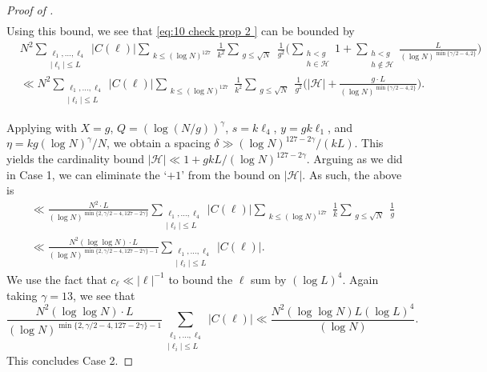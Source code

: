 \documentclass[12pt]{amsart}
\renewcommand{\leq}{\leqslant}
\numberwithin{equation}{section}
\theoremstyle{plain}
\theoremstyle{definition}
\renewcommand{\l}{\ell}
\newcommand{\CH}{\mathcal{H}}
\begin{document}
\begin{proof}[Proof of ]
\begin{align*}
		\end{align*}
		Using this bound, we see that \eqref{eq:10 check prop 2 } can be bounded by
		\begin{align*}
			&N^2\sum_{\substack{\l_1,\dots,\l_4 \\ |\l_i| \leq L}} |C(\bm{\l})| \sum_{\substack{k \leq (\log N)^{127}}} \frac{1}{k^2} \sum_{\substack{g \leq \sqrt{N}}} \frac{1}{g^2} \bigg(\sum_{\substack{h < g \\ h \in \CH }}1 +\sum_{\substack{h < g \\ h \not\in \CH}}\frac{L}{(\log N)^{\min\{\gamma/2-4,2\}}}\bigg)\\
			&\ll N^2\sum_{\substack{\l_1,\dots,\l_4 \\ |\l_i| \leq L}} |C(\bm{\l})|\sum_{\substack{k \leq (\log N)^{127}}} \frac{1}{k^2} \sum_{\substack{g \leq \sqrt{N}}} \frac{1}{g^2} \bigg( |\CH| +\frac{g \cdot L}{(\log N)^{\min\{\gamma/2-4,2\}}}\bigg).
		\end{align*}
		
		Applying  with $X=g$, $Q=(\log(N/g))^\gamma$, $s=k\l_4$, $y=gk\l_1$, and $\eta = kg(\log N)^\gamma/N$, we obtain a spacing $\delta \gg (\log N)^{127-2\gamma} / (k L)$. This yields the cardinality bound $|\CH| \ll 1+g k L/(\log N)^{127 - 2\gamma}$. Arguing as we did in Case 1, we can eliminate the `$+1$' from the bound on $|\CH|$. As such, the above is
		\begin{align*}
			&\ll \frac{N^2\cdot L}{(\log N)^{\min\{2,\gamma/2-4,127-2\gamma\}}} \sum_{\substack{\l_1,\dots,\l_4 \\ |\l_i| \leq L}} |C(\bm{\l})| \sum_{\substack{k \leq (\log N)^{127}}} \frac{1}{k}\sum_{\substack{g \leq \sqrt{N} }} \frac{1}{g}\\
			&\ll \frac{N^2 (\log \log N)\cdot L}{(\log N)^{\min\{2,\gamma/2-4,127-2\gamma\}- 1}} \sum_{\substack{\l_1,\dots,\l_4 \\ |\l_i| \leq L}} |C(\bm{\l})|.
		\end{align*}
		We use the fact that $c_\l \ll |\l|^{-1}$ to bound the $\l$ sum by $(\log L)^4$. Again taking $\gamma = 13$, we see that
		\begin{equation}\label{eq:16 check prop 2 }
			\frac{N^2(\log \log N)\cdot L}{(\log N)^{\min\{2,\gamma/2-4,127-2\gamma\}- 1}} \sum_{\substack{\l_1,\dots,\l_4 \\ |\l_i| \leq L}} |C(\bm{\l})| \ll \frac{N^2(\log \log N) L (\log L)^4}{(\log N)}.
		\end{equation}
		This concludes Case 2.
		

\end{proof}
\end{document}
